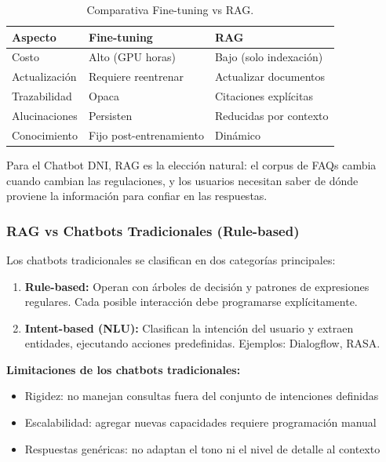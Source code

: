 \begin{table}[H]
\centering
\caption{Comparativa Fine-tuning vs RAG.}
\label{tab:finetuning-vs-rag}
\begin{tabular}{@{}lll@{}}
\toprule
\textbf{Aspecto} & \textbf{Fine-tuning} & \textbf{RAG} \\
\midrule
Costo & Alto (GPU horas) & Bajo (solo indexaci\'on) \\
Actualizaci\'on & Requiere reentrenar & Actualizar documentos \\
Trazabilidad & Opaca & Citaciones expl\'icitas \\
Alucinaciones & Persisten & Reducidas por contexto \\
Conocimiento & Fijo post-entrenamiento & Din\'amico \\
\bottomrule
\end{tabular}
\end{table}

Para el Chatbot DNI, RAG es la elecci\'on natural: el corpus de FAQs cambia cuando cambian las regulaciones, y los usuarios necesitan saber de d\'onde proviene la informaci\'on para confiar en las respuestas.

\subsubsection{RAG vs Chatbots Tradicionales (Rule-based)}
\label{subsubsec:rag-vs-traditional}

Los chatbots tradicionales se clasifican en dos categor\'ias principales:

\begin{enumerate}
    \item \textbf{Rule-based:} Operan con \'arboles de decisi\'on y patrones de expresiones regulares. Cada posible interacci\'on debe programarse expl\'icitamente.
    \item \textbf{Intent-based (NLU):} Clasifican la intenci\'on del usuario y extraen entidades, ejecutando acciones predefinidas. Ejemplos: Dialogflow, RASA.
\end{enumerate}

\textbf{Limitaciones de los chatbots tradicionales:}
\begin{itemize}
    \item Rigidez: no manejan consultas fuera del conjunto de intenciones definidas
    \item Escalabilidad: agregar nuevas capacidades requiere programaci\'on manual
    \item Respuestas gen\'ericas: no adaptan el tono ni el nivel de detalle al contexto
\end{itemize}

